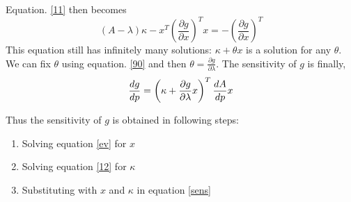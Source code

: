 \documentclass{tufte-handout}
\begin{document}
Equation. \ref{11}  then becomes 
 \begin{equation}\label{12}
 (A-\lambda) \kappa - x^T \left( \frac{\partial g}{\partial x} \right)^T  x   = -\left(  \frac{\partial g}{\partial x} \right) ^T
 \end{equation}
 This equation still has infinitely many solutions:  $\kappa + \theta x $ is a solution for any $\theta$. We can fix $\theta $ using equation. \ref{90} and then $\theta = \frac{\partial g}{ \partial \lambda} $. 
  The sensitivity of $g$ is finally, 
  \begin{equation}{\label{sens}}
  \frac{d g}{d p}  =\left( \kappa +  \frac{\partial g}{ \partial \lambda} x \right) ^T \frac{d A}{d p}  x 
  \end{equation}
  
  Thus the sensitivity of $g$ is obtained in following steps: 
  \begin{enumerate}
  	\item Solving equation \ref{ev} for $x$
  	\item  Solving equation \ref{12} for $\kappa$
  	\item Substituting with $x$ and $\kappa$ in equation \ref{sens}
  \end{enumerate}
\end{document}
